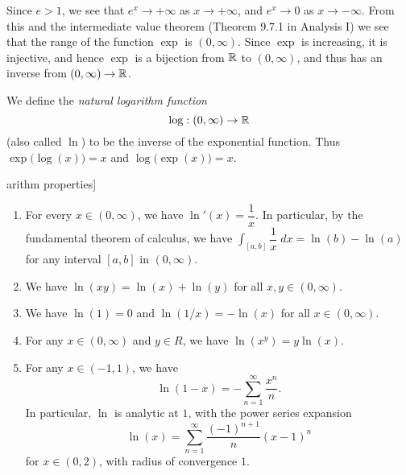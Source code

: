 \begin{note}
  Since \(e > 1\), we see that \(e^x \to +\infty\) as \(x \to +\infty\), and \(e^x \to 0\) as \(x \to -\infty\).
  From this and the intermediate value theorem (Theorem 9.7.1 in Analysis I) we see that the range of the function \(\exp\) is \((0, \infty)\).
  Since \(\exp\) is increasing, it is injective, and hence \(\exp\) is a bijection from \(\mathbb{R}\) to \((0, \infty)\), and thus has an inverse from \((0, \infty) \to \mathbb{R}\).
\end{note}

\begin{defn}[Logarithm]\label{4.5.5}
  We define the \emph{natural logarithm function}
  \[
    \log : (0, \infty) \to \mathbb{R}
  \]
  (also called \(\ln\)) to be the inverse of the exponential function.
  Thus \(\exp\big(\log(x)\big) = x\) and \(\log\big(\exp(x)\big) = x\).
\end{defn}

\begin{thm}arithm properties]\label{4.5.6}
  \quad
  \begin{enumerate}
    \item For every \(x \in (0, \infty)\), we have \(\ln'(x) = \dfrac{1}{x}\).
          In particular, by the fundamental theorem of calculus, we have \(\int_{[a, b]} \dfrac{1}{x} \; dx = \ln(b) - \ln(a)\) for any interval \([a, b]\) in \((0, \infty)\).
    \item We have \(\ln(xy) = \ln(x) + \ln(y)\) for all \(x, y \in (0, \infty)\).
    \item We have \(\ln(1) = 0\) and \(\ln(1 / x) = -\ln(x)\) for all \(x \in (0, \infty)\).
    \item For any \(x \in (0, \infty)\) and \(y \in R\), we have \(\ln(x^y) = y \ln(x)\).
    \item For any \(x \in (-1, 1)\), we have
          \[
            \ln(1 - x) = - \sum_{n = 1}^\infty \dfrac{x^n}{n}.
          \]
          In particular, \(\ln\) is analytic at \(1\), with the power series expansion
          \[
            \ln(x) = \sum_{n = 1}^\infty \dfrac{(-1)^{n + 1}}{n} (x - 1)^n
          \]
          for \(x \in (0, 2)\), with radius of convergence \(1\).
  \end{enumerate}
\end{thm}

